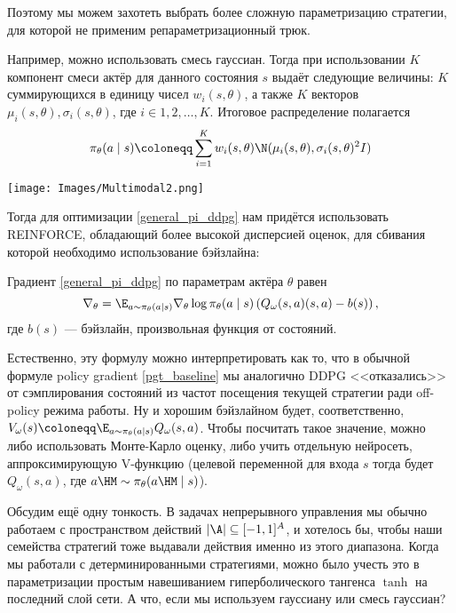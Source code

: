 Поэтому мы можем захотеть выбрать более сложную параметризацию стратегии, для которой не применим репараметризационный трюк.

\begin{exampleBox}[label=ex:gaussianmixture_policy, righthand ratio=0.35, sidebyside, sidebyside align=center, lower separated=false]{}
Например, можно использовать смесь гауссиан. Тогда при использовании $K$ компонент смеси актёр для данного состояния $s$ выдаёт следующие величины: $K$ суммирующихся в единицу чисел $w_i(s, \theta)$, а также $K$ векторов $\mu_i(s, \theta), \sigma_i(s, \theta)$, где $i \in {1, 2, \dots, K}$. Итоговое распределение полагается
$$\pi_\theta(a \mid s) \coloneqq \sum_{i = 1}^K w_i(s, \theta) \N(\mu_i(s, \theta), \sigma_i(s, \theta)^2I)$$

\tcblower
\texttt{[image: Images/Multimodal2.png]}
\end{exampleBox}

Тогда для оптимизации \eqref{general_pi_ddpg} нам придётся использовать REINFORCE, обладающий более высокой дисперсией оценок, для сбивания которой необходимо использование бэйзлайна:

\begin{proposition}
Градиент \eqref{general_pi_ddpg} по параметрам актёра $\theta$ равен
$$\nabla_\theta = \E_{a \sim \pi_\theta(a \mid s)} \nabla_{\theta} \log \pi_\theta(a \mid s) \left( Q_\omega(s, a)(s, a) - b(s) \right),$$
где $b(s)$ --- бэйзлайн, произвольная функция от состояний.
\end{proposition}

Естественно, эту формулу можно интерпретировать как то, что в обычной формуле policy gradient \eqref{pgt_baseline} мы аналогично DDPG <<отказались>> от сэмплирования состояний из частот посещения текущей стратегии ради off-policy режима работы. Ну и хорошим бэйзлайном будет, соответственно, $V_\omega(s) \coloneqq \E_{a \sim \pi_\theta(a \mid s)} Q_\omega(s, a)$. Чтобы посчитать такое значение, можно либо использовать Монте-Карло оценку, либо учить отдельную нейросеть, аппроксимирующую V-функцию (целевой переменной для входа $s$ тогда будет $Q_\omega(s, a)$, где $a \HM\sim \pi_\theta(a \HM\mid s)$).

Обсудим ещё одну тонкость. В задачах непрерывного управления мы обычно работаем с пространством действий $|\A| \subseteq [-1, 1]^A$, и хотелось бы, чтобы наши семейства стратегий тоже выдавали действия именно из этого диапазона. Когда мы работали с детерминированными стратегиями, можно было учесть это в параметризации простым навешиванием гиперболического тангенса $\tanh$ на последний слой сети. А что, если мы используем гауссиану или смесь гауссиан?


